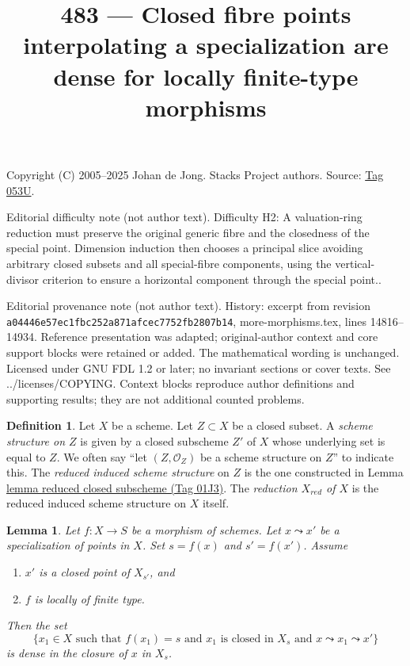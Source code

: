 \documentclass{amsart}
\theoremstyle{plain}
\newtheorem{lemma}[subsection]{Lemma}
\theoremstyle{definition}
\newtheorem{definition}[subsection]{Definition}
\theoremstyle{remark}
\numberwithin{equation}{subsection}
\begin{document}
\title[Stacks Project, Tag 053U]{483 --- Closed fibre points interpolating a specialization are dense for locally finite-type morphisms}
\maketitle
\noindent Copyright (C) 2005--2025 Johan de Jong. Stacks Project authors. Source: \href{https://stacks.math.columbia.edu/tag/053U}{Tag 053U}.

\noindent Editorial difficulty note (not author text). Difficulty H2: A valuation-ring reduction must preserve the original generic fibre and the closedness of the special point. Dimension induction then chooses a principal slice avoiding arbitrary closed subsets and all special-fibre components, using the vertical-divisor criterion to ensure a horizontal component through the special point..

\noindent Editorial provenance note (not author text). History: excerpt from revision \texttt{a0444\allowbreak 6e57e\allowbreak c1fbc\allowbreak 252a8\allowbreak 71afc\allowbreak ec775\allowbreak 2fb28\allowbreak 07b14}, more-morphisms.tex, lines 14816--14934. Reference presentation was adapted; original-author context and core support blocks were retained or added. The mathematical wording is unchanged. Licensed under GNU FDL 1.2 or later; no invariant sections or cover texts. See ../licenses/COPYING. Context blocks reproduce author definitions and supporting results; they are not additional counted problems.

\begin{definition}
\label{schemes-definition-reduced-induced-scheme}
Let $X$ be a scheme. Let $Z \subset X$ be a closed subset.
A {\it scheme structure on $Z$} is given by a closed subscheme $Z'$ of
$X$ whose underlying set is equal to $Z$. We often say
``let $(Z, \mathcal{O}_Z)$ be a scheme structure on $Z$'' to
indicate this. The {\it reduced induced scheme structure}
on $Z$ is the one constructed in Lemma \href{https://stacks.math.columbia.edu/tag/01J3}{lemma reduced closed subscheme (Tag 01J3)}.
The {\it reduction $X_{red}$ of $X$} is the reduced induced scheme
structure on $X$ itself.
\end{definition}

\begin{lemma}
\label{lemma-closed-point-nearby-fibre}
Let $f : X \to S$ be a morphism of schemes.
Let $x \leadsto x'$ be a specialization of points in $X$.
Set $s = f(x)$ and $s' = f(x')$.
Assume
\begin{enumerate}
\item $x'$ is a closed point of $X_{s'}$, and
\item $f$ is locally of finite type.
\end{enumerate}
Then the set
$$
\{x_1 \in X
\text{ such that }
f(x_1) = s
\text{ and }
x_1\text{ is closed in }X_s
\text{ and }
x \leadsto x_1 \leadsto x'
\}
$$
is dense in the closure of $x$ in $X_s$.
\end{lemma}
\end{document}
